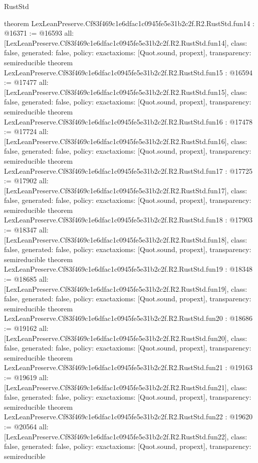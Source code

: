 \begin{lexlean}{RustStd}
\begin{coremodule}
{}
theorem LexLeanPreserve.Cf83f469c1e6dfac1c0945fe5e31b2c2f.R2.RustStd.fun14 : @16371 := @16593 {
  all: [LexLeanPreserve.Cf83f469c1e6dfac1c0945fe5e31b2c2f.R2.RustStd.fun14],
  class: false,
  generated: false,
  policy: exact{axioms: [Quot.sound, propext]},
  transparency: semireducible
}
theorem LexLeanPreserve.Cf83f469c1e6dfac1c0945fe5e31b2c2f.R2.RustStd.fun15 : @16594 := @17477 {
  all: [LexLeanPreserve.Cf83f469c1e6dfac1c0945fe5e31b2c2f.R2.RustStd.fun15],
  class: false,
  generated: false,
  policy: exact{axioms: [Quot.sound, propext]},
  transparency: semireducible
}
theorem LexLeanPreserve.Cf83f469c1e6dfac1c0945fe5e31b2c2f.R2.RustStd.fun16 : @17478 := @17724 {
  all: [LexLeanPreserve.Cf83f469c1e6dfac1c0945fe5e31b2c2f.R2.RustStd.fun16],
  class: false,
  generated: false,
  policy: exact{axioms: [Quot.sound, propext]},
  transparency: semireducible
}
theorem LexLeanPreserve.Cf83f469c1e6dfac1c0945fe5e31b2c2f.R2.RustStd.fun17 : @17725 := @17902 {
  all: [LexLeanPreserve.Cf83f469c1e6dfac1c0945fe5e31b2c2f.R2.RustStd.fun17],
  class: false,
  generated: false,
  policy: exact{axioms: [Quot.sound, propext]},
  transparency: semireducible
}
theorem LexLeanPreserve.Cf83f469c1e6dfac1c0945fe5e31b2c2f.R2.RustStd.fun18 : @17903 := @18347 {
  all: [LexLeanPreserve.Cf83f469c1e6dfac1c0945fe5e31b2c2f.R2.RustStd.fun18],
  class: false,
  generated: false,
  policy: exact{axioms: [Quot.sound, propext]},
  transparency: semireducible
}
theorem LexLeanPreserve.Cf83f469c1e6dfac1c0945fe5e31b2c2f.R2.RustStd.fun19 : @18348 := @18685 {
  all: [LexLeanPreserve.Cf83f469c1e6dfac1c0945fe5e31b2c2f.R2.RustStd.fun19],
  class: false,
  generated: false,
  policy: exact{axioms: [Quot.sound, propext]},
  transparency: semireducible
}
theorem LexLeanPreserve.Cf83f469c1e6dfac1c0945fe5e31b2c2f.R2.RustStd.fun20 : @18686 := @19162 {
  all: [LexLeanPreserve.Cf83f469c1e6dfac1c0945fe5e31b2c2f.R2.RustStd.fun20],
  class: false,
  generated: false,
  policy: exact{axioms: [Quot.sound, propext]},
  transparency: semireducible
}
theorem LexLeanPreserve.Cf83f469c1e6dfac1c0945fe5e31b2c2f.R2.RustStd.fun21 : @19163 := @19619 {
  all: [LexLeanPreserve.Cf83f469c1e6dfac1c0945fe5e31b2c2f.R2.RustStd.fun21],
  class: false,
  generated: false,
  policy: exact{axioms: [Quot.sound, propext]},
  transparency: semireducible
}
theorem LexLeanPreserve.Cf83f469c1e6dfac1c0945fe5e31b2c2f.R2.RustStd.fun22 : @19620 := @20564 {
  all: [LexLeanPreserve.Cf83f469c1e6dfac1c0945fe5e31b2c2f.R2.RustStd.fun22],
  class: false,
  generated: false,
  policy: exact{axioms: [Quot.sound, propext]},
  transparency: semireducible
}
\end{coremodule}
\end{lexlean}
